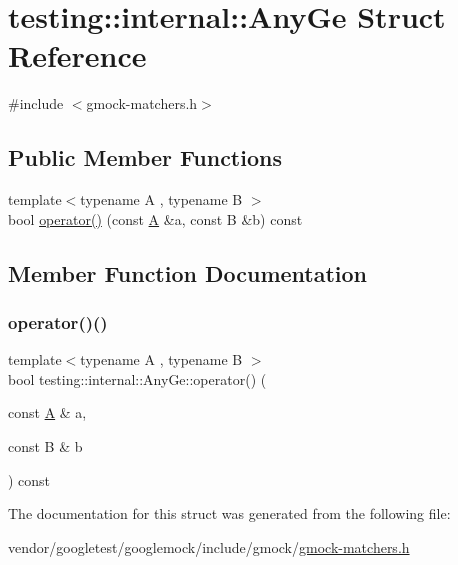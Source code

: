 \hypertarget{structtesting_1_1internal_1_1_any_ge}{}\section{testing\+:\+:internal\+:\+:Any\+Ge Struct Reference}
\label{structtesting_1_1internal_1_1_any_ge}


{\ttfamily \#include $<$gmock-\/matchers.\+h$>$}

\subsection*{Public Member Functions}
\begin{DoxyCompactItemize}
\item 
{\footnotesize template$<$typename A , typename B $>$ }\\bool \hyperlink{structtesting_1_1internal_1_1_any_ge_ac4bace6395f9517bc93f34bc1479227d}{operator()} (const \hyperlink{namespacetesting_a5e9134d655d2fc9323902348083282e7}{A} \&a, const B \&b) const
\end{DoxyCompactItemize}


\subsection{Member Function Documentation}
\mbox{\label{structtesting_1_1internal_1_1_any_ge_ac4bace6395f9517bc93f34bc1479227d}} 
\subsubsection{\texorpdfstring{operator()()}{operator()()}}
{\footnotesize\ttfamily template$<$typename A , typename B $>$ \\
bool testing\+::internal\+::\+Any\+Ge\+::operator() (\begin{DoxyParamCaption}\item[{const \hyperlink{namespacetesting_a5e9134d655d2fc9323902348083282e7}{A} \&}]{a,  }\item[{const B \&}]{b }\end{DoxyParamCaption}) const\hspace{0.3cm}{\ttfamily [inline]}}



The documentation for this struct was generated from the following file\+:\begin{DoxyCompactItemize}
\item 
vendor/googletest/googlemock/include/gmock/\hyperlink{gmock-matchers_8h}{gmock-\/matchers.\+h}\end{DoxyCompactItemize}
